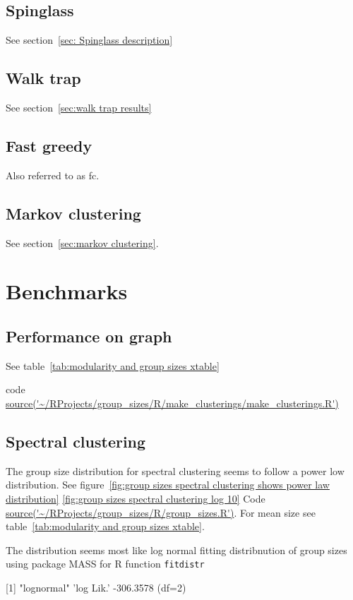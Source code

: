 \subsection{Spinglass}
See section~\ref{sec: Spinglass description}

\subsection{Walk trap}
See section~\ref{sec:walk trap results}

\cite{pons2005computing}
\subsection{Fast greedy}
Also referred to as fc.
\cite{clauset2004finding}


\subsection{Markov clustering}
See section~\ref{sec:markov clustering}.




\section{Benchmarks}

\subsection{Performance on graph}
See table~\ref{tab:modularity and group sizes xtable} 

code \url{source('~/RProjects/group_sizes/R/make_clusterings/make_clusterings.R')}

\subsection{Spectral clustering}

The group size distribution for spectral clustering seems to follow a power low distribution. See figure~\ref{fig:group sizes spectral clustering shows power law distribution} \ref{fig:group sizes spectral clustering log 10} Code \url{source('~/RProjects/group_sizes/R/group_sizes.R')}. For mean size see table~\ref{tab:modularity and group sizes xtable}. 

The distribution seems most like log normal fitting distribnution of group sizes using package MASS for R function \texttt{fitdistr}

[1] "lognormal"
'log Lik.' -306.3578 (df=2)

